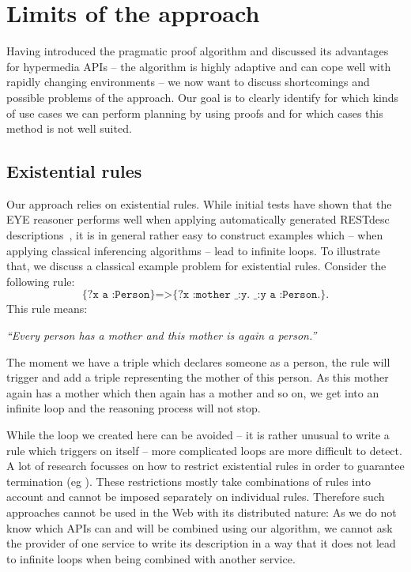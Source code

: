 \section{Limits of the approach}\label{sec:limits}
Having introduced the pragmatic proof algorithm and discussed its advantages for hypermedia APIs -- the algorithm is highly adaptive and can cope well with rapidly 
changing environments -- we now want to discuss shortcomings and possible problems of the approach.
Our
goal is to clearly identify for which kinds of use cases we can perform planning by using proofs and for which cases this method is not well suited.

\subsection{Existential rules}
Our approach relies on existential rules. While initial tests have shown that the EYE reasoner performs well when applying automatically generated RESTdesc 
descriptions~\cite{PP}, it is in general rather easy to construct examples which -- when applying classical inferencing algorithms -- 
lead to infinite loops. To illustrate that, we discuss a classical example problem for existential rules. Consider the following rule:
\[
\texttt{ \{?x a :Person\}=>\{?x :mother \_:y. \_:y a :Person.\}. }
\]
This rule means:

\begin{center}\textit{``Every person has a mother and this mother is again a person.''}\end{center}

The moment we have a triple which declares someone as a person, the rule will trigger and add a triple representing
the mother of this person. As this mother again has a mother which then again has a mother and so on, we get into an infinite loop and the reasoning process will not stop.

While the loop we created here can be avoided -- it is rather unusual to write a rule which triggers on itself -- more complicated loops are more difficult to detect.
A lot of research focusses on how to restrict existential rules in order to guarantee termination %
(eg \cite{krotzsch2011extending,gottlob2013combining,Baget}). 
These restrictions mostly take combinations of rules into account and cannot be imposed separately on individual rules. %
Therefore such approaches cannot be 
used in the Web with its distributed nature: As we do not know which APIs can and will be combined using our algorithm, we cannot ask the provider of one service 
to write its description in a way that it does not lead to infinite loops when being combined with another service.

